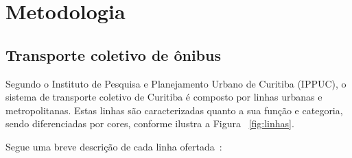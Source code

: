 
\chapter{Metodologia}
\label{cap:materialemetodos}

\section{Transporte coletivo de ônibus}




Segundo o Instituto de Pesquisa e Planejamento Urbano de Curitiba (IPPUC), o sistema de transporte coletivo de Curitiba é composto por linhas urbanas e metropolitanas. Estas linhas são caracterizadas quanto a sua função e categoria, sendo diferenciadas por cores, conforme ilustra a Figura ~\ref{fig:linhas}. 

Segue uma breve descrição de cada linha ofertada~\cite{Cur:19}:

